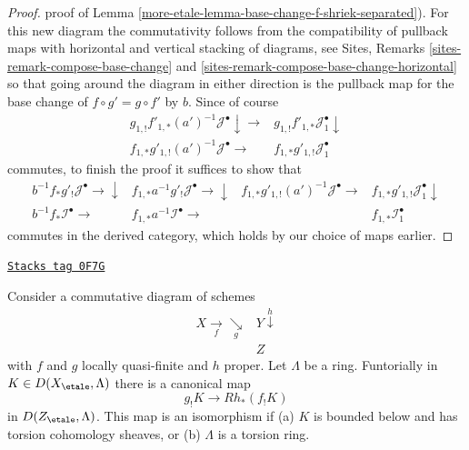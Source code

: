 \begin{proof}
proof of Lemma \ref{more-etale-lemma-base-change-f-shriek-separated}).
For this new diagram the commutativity follows from the compatibility
of pullback maps with horizontal and vertical stacking of diagrams, see
Sites, Remarks \ref{sites-remark-compose-base-change} and
\ref{sites-remark-compose-base-change-horizontal}
so that going around the diagram in either direction is the pullback
map for the base change of $f \circ g' = g \circ f'$ by $b$.
Since of course
$$
\begin{array}{cc}g_{1, !}f'_{1, *}(a')^{-1}\mathcal{J}^\bullet \downarrow\longrightarrow & g_{1, !}f'_{1, *}\mathcal{J}_1^\bullet \downarrow \\ f_{1, *}g'_{1, !}(a')^{-1}\mathcal{J}^\bullet \longrightarrow & f_{1, *}g'_{1, !}\mathcal{J}_1^\bullet\end{array}
$$
commutes, to finish the proof it suffices to show that
$$
\begin{array}{cccc}b^{-1}f_*g'_!\mathcal{J}^\bullet \longrightarrow\downarrow & f_{1, *}a^{-1}g'_!\mathcal{J}^\bullet \longrightarrow\downarrow & f_{1, *}g'_{1, !}(a')^{-1}\mathcal{J}^\bullet \longrightarrow & f_{1, *}g'_{1, !}\mathcal{J}_1^\bullet \downarrow \\ b^{-1}f_*\mathcal{I}^\bullet \longrightarrow & f_{1, *}a^{-1}\mathcal{I}^\bullet \longrightarrow &  & f_{1, *}\mathcal{I}_1^\bullet\end{array}
$$
commutes in the derived category, which holds by our choice of
maps earlier.
\end{proof}

\begin{lemma}
\label{more-etale-lemma-shriek-lqf-and-proper}
\href{https://stacks.math.columbia.edu/tag/0F7G}{\texttt{Stacks tag 0F7G}}

Consider a commutative diagram of schemes
$$
\begin{array}{cc}X \underset{f}{\longrightarrow}\underset{g}{\searrow} & Y \overset{h}{\downarrow} \\  & Z\end{array}
$$
with $f$ and $g$ locally quasi-finite and $h$ proper. Let $\Lambda$ be a ring.
Funtorially in $K \in D(X_\etale, \Lambda)$ there is a canonical map
$$
g_!K \longrightarrow Rh_*(f_!K)
$$
in $D(Z_\etale, \Lambda)$. This map is an isomorphism if
(a) $K$ is bounded below and has torsion cohomology sheaves, or
(b) $\Lambda$ is a torsion ring.
\end{lemma}

